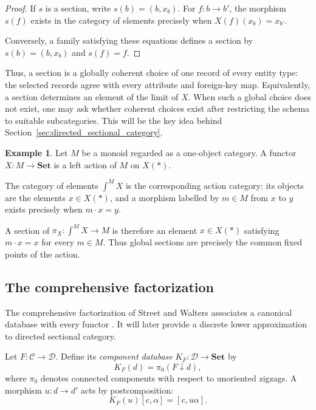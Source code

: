 \documentclass[12pt]{amsart}
\theoremstyle{definition}
\newtheorem{example}[teo]{Example}
\theoremstyle{remark}
\numberwithin{figure}{section}%
\newcommand{\CC}{\mathcal{C}}
\newcommand{\Dc}{\mathcal{D}}
\newcommand{\Sets}{\mathbf{Set}}
\begin{document}
\begin{proof}
If \(s\) is a section, write \(s(b)=(b,x_b)\). For
\(f\colon b\to b'\), the morphism \(s(f)\) exists in the category of
elements precisely when \(X(f)(x_b)=x_{b'}\).

Conversely, a family satisfying these equations defines a section by
\(s(b)=(b,x_b)\) and \(s(f)=f\).
\end{proof}

Thus, a section is a globally coherent choice of one record of every entity
type: the selected records agree with every attribute and foreign-key map.
Equivalently, a section determines an element of the limit of \(X\). When
such a global choice does not exist, one may ask whether coherent choices
exist after restricting the schema to suitable subcategories. This will be the key idea behind Section~\ref{sec:directed_sectional_category}.

\begin{example}\label{example:monoid_action_database}
Let \(M\) be a monoid regarded as a one-object category. A functor
\(X\colon M\to\Sets\) is a left action of \(M\) on \(X(\ast)\).

The category of elements \(\int^M X\) is the corresponding action category:
its objects are the elements \(x\in X(\ast)\), and a morphism labelled by
\(m\in M\) from \(x\) to \(y\) exists precisely when \(m\cdot x=y\).

A section of \(\pi_X\colon\int^M X\to M\) is therefore an element
\(x\in X(\ast)\) satisfying \(m\cdot x=x\) for every \(m\in M\). Thus
global sections are precisely the common fixed points of the action.
\end{example}


\subsection{The comprehensive factorization}
\label{subsec:discrete_factorization}

The comprehensive factorization of Street and Walters associates a
canonical database with every functor \cite{StreetWalters}. It will later
provide a discrete lower approximation to directed sectional category.

Let \(F\colon\CC\to\Dc\). Define its \emph{component database}
\(K_F\colon\Dc\to\Sets\) by
\[
K_F(d)=\pi_0(F\downarrow d),
\]
where \(\pi_0\) denotes connected components with respect to unoriented
zigzags. A morphism \(u\colon d\to d'\) acts by postcomposition:
\[
K_F(u)[c,\alpha]=[c,u\alpha].
\]
\end{document}
